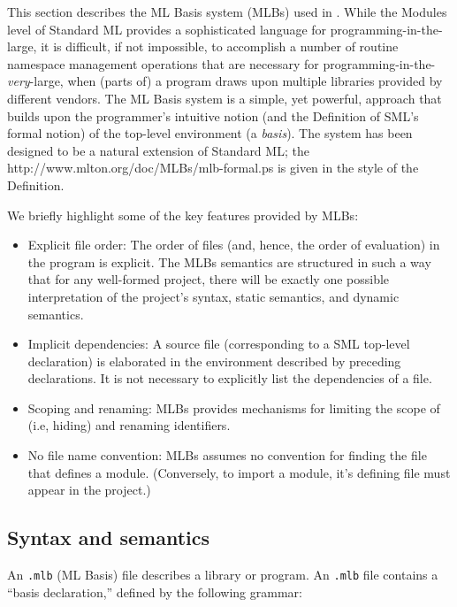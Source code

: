%
This section describes the ML Basis system (MLBs) used in {\mlton}.
While the Modules level of Standard ML provides a sophisticated
language for programming-in-the-large, it is difficult, if not
impossible, to accomplish a number of routine namespace management
operations that are necessary for
programming-in-the-\emph{very}-large, when (parts of) a program draws
upon multiple libraries provided by different vendors.  The ML Basis
system is a simple, yet powerful, approach that builds upon the
programmer's intuitive notion (and the Definition of SML's formal
notion) of the top-level environment (a \emph{basis}).  The system has
been designed to be a natural extension of Standard ML;
the
                  {http://www.mlton.org/doc/MLBs/mlb-formal.ps}
is given in the style of the Definition.

We briefly highlight some of the key features provided by MLBs:
\begin{itemize}
\item Explicit file order: The order of files (and, hence, the order
  of evaluation) in the program is explicit.  The MLBs semantics are
  structured in such a way that for any well-formed project, there
  will be exactly one possible interpretation of the project's syntax,
  static semantics, and dynamic semantics.
\item Implicit dependencies: A source file (corresponding to a SML
  top-level declaration) is elaborated in the environment described by
  preceding declarations.  It is not necessary to explicitly list the
  dependencies of a file.
\item Scoping and renaming: MLBs provides mechanisms for limiting the
  scope of (i.e, hiding) and renaming identifiers.
\item No file name convention: MLBs assumes no convention for finding
  the file that defines a module.  (Conversely, to import a module,
  it's defining file must appear in the project.)
\end{itemize}

%
\subsection{Syntax and semantics}

An {\tt .mlb} (ML Basis) file describes a library or program.  An
{\tt .mlb} file contains a ``basis declaration,'' defined by the
following grammar:

